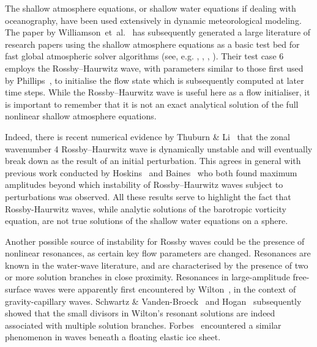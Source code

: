 The shallow atmosphere equations, or shallow water equations if dealing with oceanography, have been used extensively in dynamic meteorological modeling. The paper by Williamson~et~al.~\cite{Williamson:STS} has subsequently generated a large literature of research papers using the shallow atmosphere equations as a basic test bed for fast global atmospheric solver algorithms (see, e.g. \cite{Bates:GSW}, \cite{Cheong:DFS}, \cite{Hack:STS}, \cite{Swarztrauber:STM}). Their test case 6 employs the Rossby--Haurwitz wave, with parameters similar to those first used by Phillips~\cite{Phillips:NIP}, to initialise the flow state which is subsequently computed at later time steps. While the Rossby--Haurwitz wave is useful here as a flow initialiser, it is important to remember that it is not an exact analytical solution of the full nonlinear shallow atmosphere equations. 

Indeed, there is recent numerical evidence by Thuburn \& Li~\cite{Thuburn:NSR} that the zonal wavenumber 4 Rossby--Haurwitz wave is dynamically unstable and will eventually break down as the result of an initial perturbation. This agrees in general with previous work conducted by Hoskins~\cite{Hoskins:SRH} and Baines~\cite{Baines:SPW} who both found maximum amplitudes beyond which instability of Rossby--Haurwitz waves subject to perturbations was observed. All these results serve to highlight the fact that Rossby-Haurwitz waves, while analytic solutions of the barotropic vorticity equation, are not true solutions of the shallow water equations on a sphere.

Another possible source of instability for Rossby waves could be the presence of nonlinear resonances, as certain key flow parameters are changed. Resonances are known in the water-wave literature, and are characterised by the presence of two or more solution branches in close proximity. Resonances in large-amplitude free-surface waves were apparently first encountered by Wilton~\cite{Wilton:OR}, in the context of gravity-capillary waves. Schwartz \& Vanden-Broeck~\cite{Schwartz:NSE} and Hogan~\cite{Hogan:SES1,Hogan:SES2,Hogan:SES3} subsequently showed that the small divisors in Wilton's resonant solutions are indeed associated with multiple solution branches. Forbes~\cite{Forbes:SWL1,Forbes:SWL2} encountered a similar phenomenon in waves beneath a floating elastic ice sheet.

